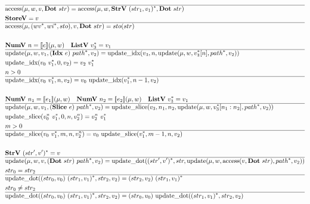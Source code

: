 \begin{align*}
  \hline
  &\access(\mu, w, v, \dotp ~ str) = \access(\mu, w, \strv ~ \seq{(str_1, v_1)}, \dotp ~ str) \\
  &\storev = v \\
  \hline
  &\access(\mu, (\seq{wv}, \seq{wi}, sto), v, \dotp ~ str) = sto(str) \\
%
\newline \\
  &\numv ~ n = \sem{e}(\mu, w) \quad
  \listv ~ \seq{v_3} = v_1 \\
  \hline
  &\update(\mu, w, v_1, (\idxp ~ e) ~ \seq{path}, v_2)
  =
  \updateidx(v_3, n, \update(\mu, w, \seq{v_3}[n], \seq{path}, v_2)) \\
  &\updateidx(v_0 ~ \seq{v_1}, 0, v_2) =  v_2 ~ \seq{v_1} \\
  &n > 0 \\
  \hline
  &\updateidx(v_0 ~ \seq{v_1}, n, v_2) =  v_0 ~ \updateidx(\seq{v_1}, n-1, v_2) \\
%
\newline \\
  &\numv ~ n_1 = \sem{e_1}(\mu, w) \quad
  \numv ~ n_2 = \sem{e_2}(\mu, w) \quad
  \listv ~ \seq{v_3} = v_1 \\
  \hline
  &\update(\mu, w, v_1, (\slicep ~ e) ~ \seq{path}, v_2)
  =
  \updateslice(v_3, n_1, n_2, \update(\mu, w, \seq{v_3}[n_1: n_2], \seq{path}, v_2)) \\
  &\updateslice(v_0^n ~ \seq{v_1}, 0, n, v_2^n) = v_2^n ~ \seq{v_1} \\
  &m > 0 \\
  \hline
  &\updateslice(v_0 ~ \seq{v_1}, m, n, v_2^n) =  v_0 ~ \updateslice(\seq{v_1}, m-1, n, v_2) \\
%
\newline \\
  &\strv ~ \seq{(str', v')} = v \\
  \hline
  &\update(\mu, w, v, (\dotp ~ str) ~ \seq{path}, v_2)
  =
  \updatedot(\seq{(str', v')}, str, \update(\mu, w, \access(v, \dotp ~ str), \seq{path}, v_2)) \\
  &str_0 = str_2 \\
  \hline
  &\updatedot((str_0, v_0) ~ \seq{(str_1, v_1)}, str_2, v_2)
  =
  (str_2, v_2) ~ \seq{(str_1, v_1)} \\
  &str_0 \not= str_2 \\
  \hline
  &\updatedot((str_0, v_0) ~ \seq{(str_1, v_1)}, str_2, v_2)
  =
  (str_0, v_0) ~ \updatedot(\seq{(str_1, v_1)}, str_2, v_2) \\

\end{align*}

